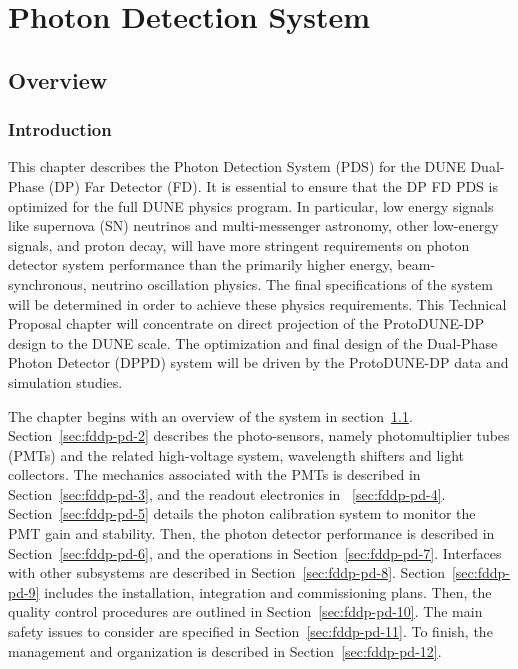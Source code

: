 \chapter{Photon Detection System}
\label{ch:fddp-pd}

\section{Overview}
\label{sec:fddp-pd-1}

\subsection{Introduction}
\label{sec:fddp-pd-1.1}

This chapter describes the Photon Detection System (PDS) for the DUNE Dual-Phase (DP) Far Detector (FD). It is essential to ensure that the DP FD PDS is optimized for the full DUNE physics program. In particular, low energy signals like supernova (SN) neutrinos and multi-messenger astronomy, other low-energy signals, and proton decay, will have more stringent requirements on photon detector system performance than the primarily higher energy, beam-synchronous, neutrino oscillation physics. The final specifications of the system will be determined in order to achieve these physics requirements. This Technical Proposal chapter will concentrate on direct projection of the ProtoDUNE-DP design to the DUNE scale. The optimization and final design of the Dual-Phase Photon Detector (DPPD) system will be driven by the ProtoDUNE-DP \cite{protoDUNDP-tdr} data and simulation studies.


The chapter begins with an overview of the system in section~\ref{sec:fddp-pd-1}. Section~\ref{sec:fddp-pd-2} describes the photo-sensors, namely photomultiplier tubes (PMTs) and the related high-voltage system, wavelength shifters and light collectors. The mechanics associated with the PMTs is described in Section~\ref{sec:fddp-pd-3}, and the readout electronics in ~\ref{sec:fddp-pd-4}. Section~\ref{sec:fddp-pd-5} details the photon calibration system to monitor the PMT gain and stability. Then, the photon detector performance is described in Section~\ref{sec:fddp-pd-6}, and the operations in Section~\ref{sec:fddp-pd-7}. Interfaces with other subsystems are described in Section~\ref{sec:fddp-pd-8}. Section~\ref{sec:fddp-pd-9} includes the installation, integration and commissioning plans. Then, the quality control procedures are outlined in Section~\ref{sec:fddp-pd-10}. The main safety issues to consider are specified in Section~\ref{sec:fddp-pd-11}. To finish, the management and organization is described in Section~\ref{sec:fddp-pd-12}.

